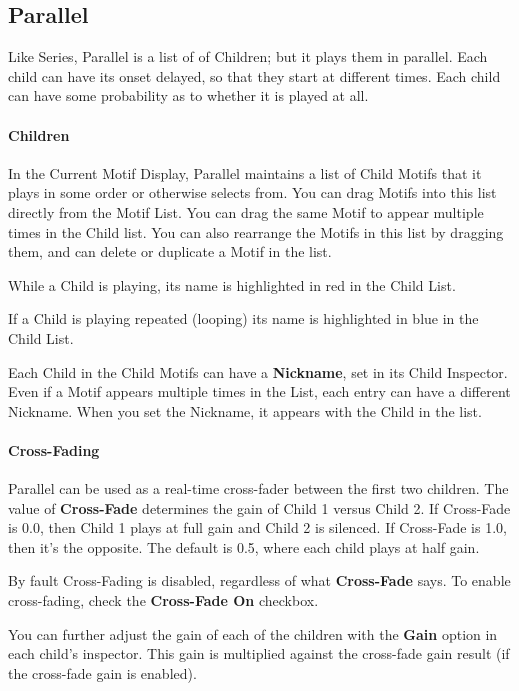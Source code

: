\documentclass[twoside,10pt]{article}
\begin{document}
\subsection{Parallel}

Like Series, Parallel is a list of of Children; but it plays them in parallel.  Each child can have its onset delayed, so that they start at different times.  Each child can have some probability as to whether it is played at all.

\paragraph{Children}

In the Current Motif Display, Parallel maintains a list of Child Motifs that it plays in some order or otherwise selects from.  You can drag Motifs into this list directly from the Motif List.  You can drag the same Motif to appear multiple times in the Child list.  You can also rearrange the Motifs in this list by dragging them, and can delete or duplicate a Motif in the list.

While a Child is playing, its name is highlighted in red in the Child List.

If a Child is playing repeated (looping) its name is highlighted in blue in the Child List.

Each Child in the Child Motifs can have a {\bf Nickname}, set in its Child Inspector.  Even if a Motif appears multiple times in the List, each entry can have a different Nickname.  When you set the Nickname, it appears with the Child in the list.

\paragraph{Cross-Fading}

Parallel can be used as a real-time cross-fader between the first two children.  The value of {\bf Cross-Fade} determines the gain of Child 1 versus Child 2.  If Cross-Fade is 0.0, then Child 1 plays at full gain and Child 2 is silenced.  If Cross-Fade is 1.0, then it's the opposite.  The default is 0.5, where each child plays at half gain.

By fault Cross-Fading is disabled, regardless of what {\bf Cross-Fade} says.  To enable cross-fading, check the {\bf Cross-Fade On} checkbox.

You can further adjust the gain of each of the children with the {\bf Gain} option in each child's inspector.  This gain is multiplied against the cross-fade gain result (if the cross-fade gain is enabled).
\end{document}
